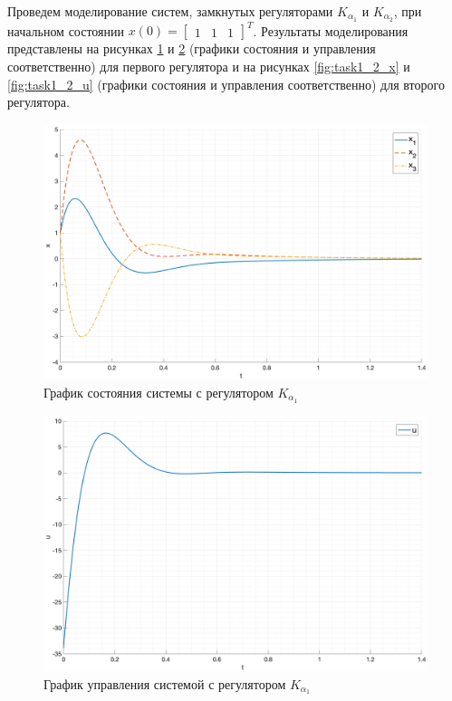 Проведем моделирование систем, замкнутых регуляторами $K_{\alpha_1}$ и $K_{\alpha_2}$,
при начальном состоянии $x(0) = \begin{bmatrix}1 & 1 & 1\end{bmatrix}^T$. 
Результаты моделирования представлены на рисунках \ref{fig:task1_1_x} и \ref{fig:task1_1_u} 
(графики состояния и управления соответственно) для первого регулятора и на рисунках \ref{fig:task1_2_x} и \ref{fig:task1_2_u} 
(графики состояния и управления соответственно) для второго регулятора.
\begin{figure}[ht!]
    \centering
    \includegraphics[width=\textwidth]{media/plots/task1_1_x.png}
    \caption{График состояния системы с регулятором $K_{\alpha_1}$}
    \label{fig:task1_1_x}
\end{figure}
\begin{figure}[ht!]
    \centering
    \includegraphics[width=\textwidth]{media/plots/task1_1_u.png}
    \caption{График управления системой с регулятором $K_{\alpha_1}$}
    \label{fig:task1_1_u}
\end{figure}
